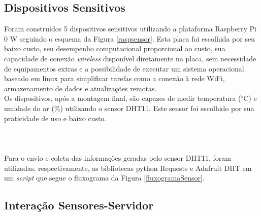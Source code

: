 \subsection{Dispositivos Sensitivos}
\quad Foram construídos 5 dispositivos sensitivos utilizando a plataforma Raspberry Pi 0 W seguindo o esquema da Figura \ref{raspsensor}. Esta placa
foi escolhida por seu baixo custo, seu desempenho computacional proporcional ao custo, sua capacidade de conexão \textit{wireless} disponível diretamente na placa, sem necessidade de equipamentos extras e a possibilidade de executar um sistema operacional baseado em linux para simplificar tarefas como a conexão à rede WiFi, armazenamento de dados e atualizações remotas.
\\\null \quad Os dispositivos, após a montagem final, são capazes de medir temperatura ($^\circ$C) e umidade do ar (\%) utilizando o sensor DHT11. Este sensor foi escolhido
por sua praticidade de uso e baixo custo.
\\\\\\
\\\null \quad Para o envio e coleta das informações geradas pelo sensor DHT11, foram utilizadas, respectivamente, as bibliotecas python Requests \cite{Requests} e Adafruit DHT \cite{AdafruitDHT} em um \textit{script} que segue o fluxograma da Figura \ref{fluxogramaSensor}.

\newpage
\subsection{Interação Sensores-Servidor}

